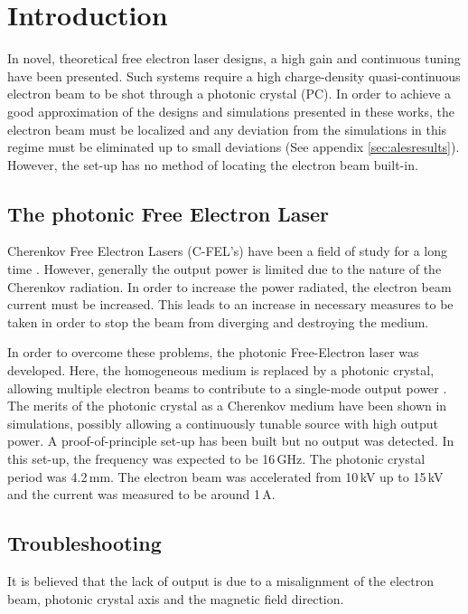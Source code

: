 \chapter{Introduction}
\label{sec:introduction}
% 
In novel, theoretical free electron laser designs, a high gain and continuous tuning have been presented. \cite{Denis} Such systems require a high charge-density quasi-continuous electron beam to be shot through a photonic crystal (PC). 
In order to achieve a good approximation of the designs and simulations presented in these works, the electron beam must be localized and any deviation from the simulations in this regime must be eliminated up to small deviations (See appendix \ref{sec:alesresults}). However, the set-up has no method of locating the electron beam built-in.

\section{The photonic Free Electron Laser}
Cherenkov Free Electron Lasers (C-FEL's) have been a field of study for a long time . However, generally the output power is limited due to the nature of the Cherenkov radiation.
In order to increase the power radiated, the electron beam current must be increased. This leads to an increase in necessary measures to be taken in order to stop the beam from diverging and destroying the medium.

In order to overcome these problems, the photonic Free-Electron laser was developed. Here, the homogeneous medium is replaced by a photonic crystal, allowing multiple electron beams to contribute to a single-mode output power \cite{DenisMultiBeam}.
The merits of the photonic crystal as a Cherenkov medium have been shown in simulations, possibly allowing a continuously tunable source with high output power.
A proof-of-principle set-up has been built \cite{Denis} but no output was detected. In this set-up, the frequency was expected to be 16\,GHz. The photonic crystal period was 4.2\,mm. The electron beam was accelerated from 10\,kV up to 15\,kV and the current was measured to be around 1\,A.

\section{Troubleshooting}
It is believed that the lack of output is due to a misalignment of the electron beam, photonic crystal axis and the magnetic field direction.

